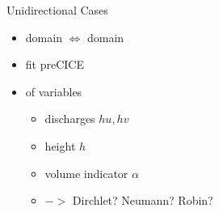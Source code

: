 \begin{frame}
\vspace{-2mm}
{\large Unidirectional Cases}\\
\begin{multicols}{2}
\begin{itemize}
\setlength\itemsep{2em}
\item {} domain $\Longleftrightarrow$  domain 
\item fit  preCICE   
\item {} of variables
\begin{itemize}
\setlength\itemsep{1em}
\vspace{5pt}
\item discharges $hu, hv$
\item height $h$
\item volume indicator $\alpha$
\item {} $->$ Dirchlet? Neumann? Robin?
\end{itemize}
\end{itemize}

\vfill\columnbreak


\end{multicols}
\end{frame}
